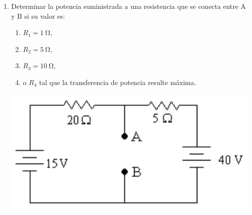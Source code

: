 \documentclass[11pt,spanish,a4paper]{article}
\begin{document}
\begin{enumerate}
	\item \begin{minipage}[t][4.5cm]{0.6\textwidth}
		Determinar la potencia suministrada a una resistencia que se conecta entre A y B si su valor es:
		\begin{enumerate}
			\item \(R_1= \SI{1}{\ohm}\),
			\item \(R_2= \SI{5}{\ohm}\),
			\item \(R_3= \SI{10}{\ohm}\),
			\item o \(R_4\) tal que la transferencia de potencia resulte máxima.
		\end{enumerate}
    \end{minipage}
    \begin{minipage}[c][1em][t]{0.35\textwidth}
            \includegraphics[width=\textwidth]{p3e05}
    \end{minipage}




\end{enumerate}
\end{document}

